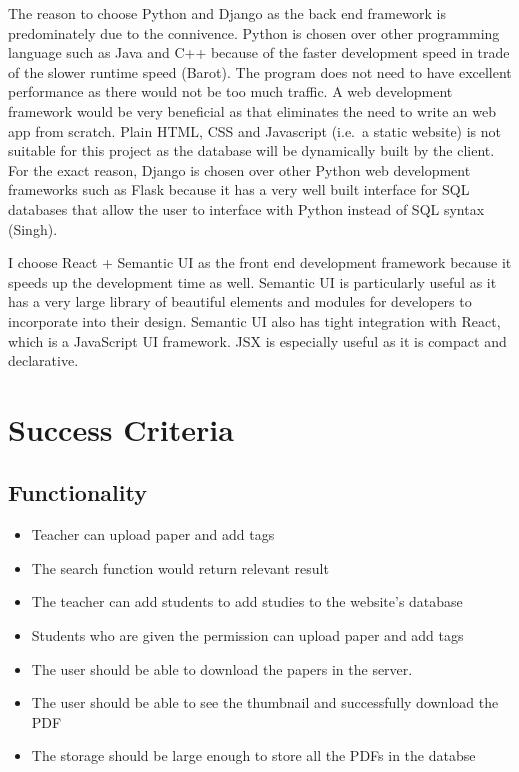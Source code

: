 \documentclass[
]{article}
\providecommand{\tightlist}{%
  \setlength{\itemsep}{0pt}\setlength{\parskip}{0pt}}
\begin{document}
The reason to choose Python and Django as the back end framework is
predominately due to the connivence. Python is chosen over other
programming language such as Java and C++ because of the faster
development speed in trade of the slower runtime speed (Barot). The
program does not need to have excellent performance as there would not
be too much traffic. A web development framework would be very
beneficial as that eliminates the need to write an web app from scratch.
Plain HTML, CSS and Javascript (i.e.~a static website) is not suitable
for this project as the database will be dynamically built by the
client. For the exact reason, Django is chosen over other Python web
development frameworks such as Flask because it has a very well built
interface for SQL databases that allow the user to interface with Python
instead of SQL syntax (Singh).

I choose React + Semantic UI as the front end development framework
because it speeds up the development time as well. Semantic UI is
particularly useful as it has a very large library of beautiful elements
and modules for developers to incorporate into their design. Semantic UI
also has tight integration with React, which is a JavaScript UI
framework. JSX is especially useful as it is compact and declarative.

\hypertarget{success-criteria}{%
\section{Success Criteria}\label{success-criteria}}

\hypertarget{functionality}{%
\subsection{Functionality}\label{functionality}}

\begin{itemize}
\tightlist
\item
  Teacher can upload paper and add tags
\item
  The search function would return relevant result
\item
  The teacher can add students to add studies to the website's database
\item
  Students who are given the permission can upload paper and add tags
\item
  The user should be able to download the papers in the server.
\item
  The user should be able to see the thumbnail and successfully download
  the PDF
\item
  The storage should be large enough to store all the PDFs in the
  databse
\end{itemize}
\end{document}
